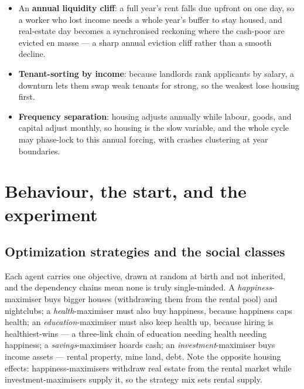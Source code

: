 \documentclass[11pt]{article}
\begin{document}
\begin{itemize}
  \item An \textbf{annual liquidity cliff}: a full year's rent falls due upfront
  on one day, so a worker who lost income needs a whole year's buffer to stay
  housed, and real-estate day becomes a synchronised reckoning where the
  cash-poor are evicted en masse --- a sharp annual eviction cliff rather than a
  smooth decline.
  \item \textbf{Tenant-sorting by income}: because landlords rank applicants by
  salary, a downturn lets them swap weak tenants for strong, so the weakest lose
  housing first.
  \item \textbf{Frequency separation}: housing adjusts annually while labour,
  goods, and capital adjust monthly, so housing is the slow variable, and the
  whole cycle may phase-lock to this annual forcing, with crashes clustering at
  year boundaries.
\end{itemize}

\section{Behaviour, the start, and the experiment}

\subsection{Optimization strategies and the social classes}

Each agent carries one objective, drawn at random at birth and not inherited,
and the dependency chains mean none is truly single-minded. A
\emph{happiness}-maximiser buys bigger houses (withdrawing them from the rental
pool) and nightclubs; a \emph{health}-maximiser must also buy happiness, because
happiness caps health; an \emph{education}-maximiser must also keep health up,
because hiring is healthiest-wins --- a three-link chain of education needing
health needing happiness; a \emph{savings}-maximiser hoards cash; an
\emph{investment}-maximiser buys income assets --- rental property, mine land,
debt. Note the opposite housing effects: happiness-maximisers withdraw real
estate from the rental market while investment-maximisers supply it, so the
strategy mix sets rental supply.
\end{document}
